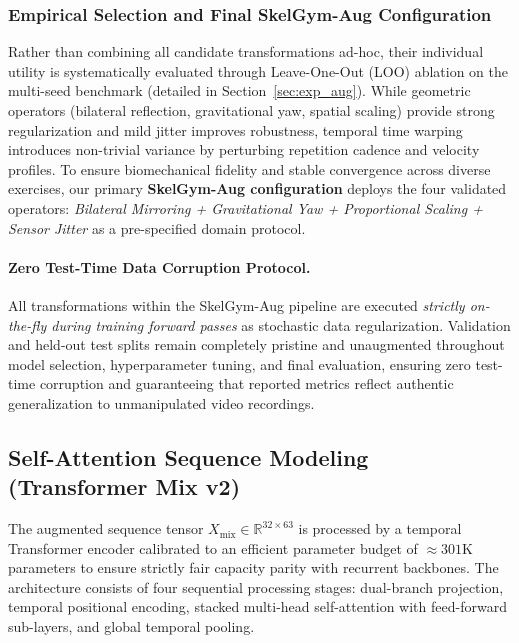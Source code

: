 \documentclass[runningheads]{llncs}
\begin{document}
\subsubsection{Empirical Selection and Final SkelGym-Aug Configuration}
Rather than combining all candidate transformations ad-hoc, their individual utility is systematically evaluated through Leave-One-Out (LOO) ablation on the multi-seed benchmark (detailed in Section~\ref{sec:exp_aug}). While geometric operators (bilateral reflection, gravitational yaw, spatial scaling) provide strong regularization and mild jitter improves robustness, temporal time warping introduces non-trivial variance by perturbing repetition cadence and velocity profiles. To ensure biomechanical fidelity and stable convergence across diverse exercises, our primary \textbf{SkelGym-Aug configuration} deploys the four validated operators: \textit{Bilateral Mirroring + Gravitational Yaw + Proportional Scaling + Sensor Jitter} as a pre-specified domain protocol.

\paragraph{Zero Test-Time Data Corruption Protocol.}
All transformations within the SkelGym-Aug pipeline are executed \textit{strictly on-the-fly during training forward passes} as stochastic data regularization. Validation and held-out test splits remain completely pristine and unaugmented throughout model selection, hyperparameter tuning, and final evaluation, ensuring zero test-time corruption and guaranteeing that reported metrics reflect authentic generalization to unmanipulated video recordings.

\subsection{Self-Attention Sequence Modeling (Transformer Mix v2)}
The augmented sequence tensor $X_{\text{mix}} \in \mathbb{R}^{32 \times 63}$ is processed by a temporal Transformer encoder \cite{vaswani2017} calibrated to an efficient parameter budget of $\approx 301\text{K}$ parameters to ensure strictly fair capacity parity with recurrent backbones. The architecture consists of four sequential processing stages: dual-branch projection, temporal positional encoding, stacked multi-head self-attention with feed-forward sub-layers, and global temporal pooling.
\end{document}
